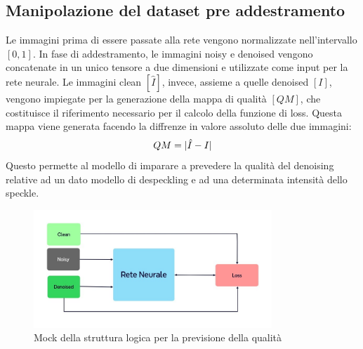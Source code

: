 \subsection{Manipolazione del dataset pre addestramento}
Le immagini prima di essere passate alla rete vengono normalizzate nell'intervallo $[0,1]$.
In fase di addestramento, le immagini noisy e denoised vengono concatenate in un unico tensore a due dimensioni e utilizzate come 
input per la rete neurale. Le immagini clean $[\hat{I}]$, invece, assieme a quelle denoised $[I]$, vengono impiegate per la 
generazione della mappa di qualità $[QM]$, che costituisce il riferimento necessario per 
il calcolo della funzione di loss. Questa mappa viene generata facendo la diffrenze in valore assoluto delle due immagini:
\begin{equation}
  \makebox[\textwidth][c]{%
    $\displaystyle
      QM = |\hat{I} - I |
    $%
  }
\end{equation}
Questo permette al modello di imparare a 
prevedere la qualità del denoising relative ad un dato modello di despeckling e ad una determinata intensità dello speckle. 
\begin{figure}[H]
    \centering
    \includegraphics[width=0.8\textwidth]{utils/Architettura_rete_neurale.jpg}
    \caption{Mock della struttura logica per la previsione della qualità}
    \label{fig:MockReteNeurale}
\end{figure}

